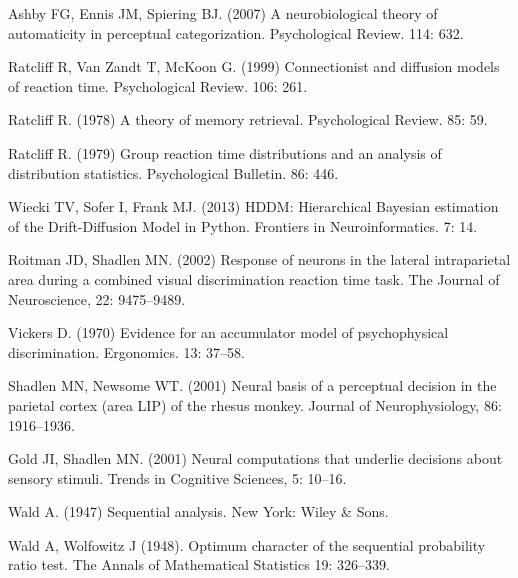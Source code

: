 \documentclass[11pt,a4paper]{scrartcl}
\begin{document}
\begin{thebibliography}{10}

Ashby FG, Ennis JM, Spiering BJ. (2007) A neurobiological theory of automaticity in perceptual categorization. 
\newblock Psychological Review. 114: 632.

Ratcliff R, Van Zandt T, McKoon G. (1999) Connectionist and diffusion models of reaction time. 
\newblock Psychological Review. 106: 261.

Ratcliff R. (1978) A theory of memory retrieval. 
\newblock Psychological Review. 85: 59.

Ratcliff R. (1979) Group reaction time distributions and an analysis of distribution statistics. 
\newblock Psychological Bulletin. 86: 446.

Wiecki TV, Sofer I,  Frank MJ. (2013) HDDM: Hierarchical Bayesian estimation of the Drift-Diffusion Model in Python.
\newblock Frontiers in Neuroinformatics. 7: 14.

Roitman JD, Shadlen MN. (2002) Response of neurons in the lateral intraparietal area during a combined visual discrimination reaction time task. 
\newblock The Journal of Neuroscience, 22: 9475--9489.

Vickers D. (1970) Evidence for an accumulator model of psychophysical discrimination. 
\newblock Ergonomics. 13: 37--58.

Shadlen MN, Newsome WT. (2001) Neural basis of a perceptual decision in the parietal cortex (area LIP) of the rhesus monkey. 
\newblock Journal of Neurophysiology, 86: 1916--1936.

Gold JI, Shadlen MN. (2001) Neural computations that underlie decisions about sensory stimuli. 
\newblock Trends in Cognitive Sciences, 5: 10--16.

Wald A. (1947) Sequential analysis.
\newblock New York: Wiley \& Sons.

Wald A, Wolfowitz J (1948). Optimum character of the sequential probability ratio test. 
\newblock The Annals of Mathematical Statistics 19: 326--339.

\end{thebibliography}
\end{document}

